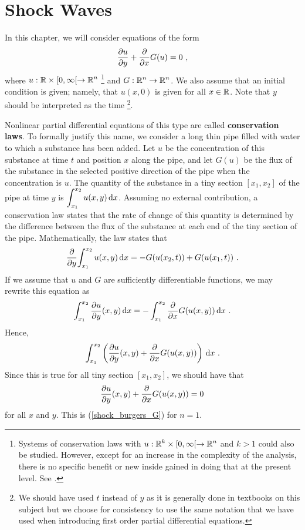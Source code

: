 \chapter{Shock Waves} \label{ChapShock}

In this chapter, we will consider equations of the form
\begin{equation}\label{shock_burgers_G}
\pdydx{u}{y} + \pdfdx{G(u)}{x} = 0 \ ,
\end{equation}
where $\displaystyle u:\RR\times [0,\infty[ \to \RR^n$
\footnote{Systems of conservation laws with
$\displaystyle u:\RR^k\times[0,\infty[ \to \RR^n$ and $k>1$ could also
be studied.  However, except for an increase in the complexity of the
analysis, there is no specific benefit or new inside gained in doing
that at the present level.  See \cite{Lax}.} and
$\displaystyle G:\RR^n \to \RR^n$. We
also assume that an initial condition is given; namely, that $u(x,0)$
is given for all $x\in \RR$.  Note that $y$ should be interpreted as
the time \footnote{We should have used $t$ instead of $y$ as it is
generally done in textbooks on this subject but we choose for
consistency to use the same notation that we have used when
introducing first order partial differential equations.}.

Nonlinear partial differential equations of this type are called
{\bfseries conservation laws}.  To formally
justify this name, we consider a long thin pipe filled with water
to which a substance has been added.  Let $u$ be the concentration of
this substance at time $t$ and position $x$ along the pipe, and let
$G(u)$ be the flux of the substance in the selected positive direction
of the pipe when the concentration is $u$.  The quantity of the
substance in a tiny section $[x_1,x_2]$ of the pipe at time $y$ is
$\displaystyle \int_{x_1}^{x_2} u(x,y) \dx{x}$.
Assuming no external contribution, a conservation law states that the
rate of change of this quantity is determined by the difference
between the flux of the substance at each end of the tiny section of
the pipe.  Mathematically, the law states that
\[
\pdfdx{ \int_{x_1}^{x_2} u(x,y) \dx{x} }{y}
= -G(u(x_2,t)) + G(u(x_1,t)) \ .
\]
If we assume that $u$ and $G$ are sufficiently differentiable
functions, we may rewrite this equation as
\[
\int_{x_1}^{x_2} \pdydx{u}{y}(x,y) \dx{x}
= - \int_{x_1}^{x_2} \pdfdx{G(u(x,y))}{x} \dx{x} \ .
\]
Hence,
\[
\int_{x_1}^{x_2} \left( \pdydx{u}{y}(x,y) + \pdfdx{G(u(x,y))}{x}
\right) \dx{x} \ .
\]
Since this is true for all tiny section $[x_1,x_2]$, we should have
that
\[
  \pdydx{u}{y}(x,y) + \pdfdx{G(u(x,y))}{x} = 0
\]
for all $x$ and $y$.  This is (\ref{shock_burgers_G}) for $n=1$.

